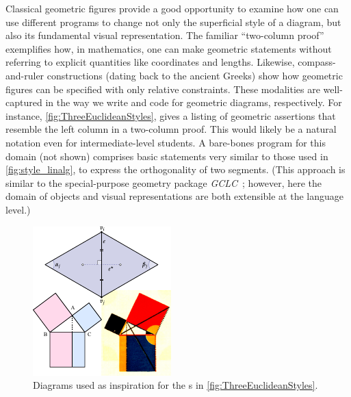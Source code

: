 Classical geometric figures provide a good opportunity to examine how one can use different \Style{} programs to change not only the superficial style of a diagram, but also its fundamental visual representation.  The familiar ``two-column proof'' exemplifies how, in mathematics, one can make geometric statements without referring to explicit quantities like coordinates and lengths.  Likewise, compass-and-ruler constructions (dating back to the ancient Greeks) show how geometric figures can be specified with only relative constraints.  These modalities are well-captured in the way we write \Substance{} and \Style{} code for geometric diagrams, respectively.  For instance, \cref{fig:ThreeEuclideanStyles},  gives a listing of geometric assertions that resemble the left column in a two-column proof. This would likely be a natural notation even for intermediate-level students.  A bare-bones \Style{} program for this domain (not shown) comprises basic statements very similar to those used in \cref{fig:style_linalg}, \eg to express the orthogonality of two segments.  (This approach is similar to the special-purpose geometry package \emph{GCLC}~\cite{Janivcic:2006:GCLC}; however, here the domain of objects and visual representations are both extensible at the language level.)

\setlength{\columnsep}{1em}
\setlength{\intextsep}{1em}
\begin{figure}
   \includegraphics[width=\linewidth]{assets/penrose/EuclideanStyleInspiration.pdf}
   \caption*{Diagrams used as inspiration for the \Style{}s in \cref{fig:ThreeEuclideanStyles}.}
 \end{figure}


